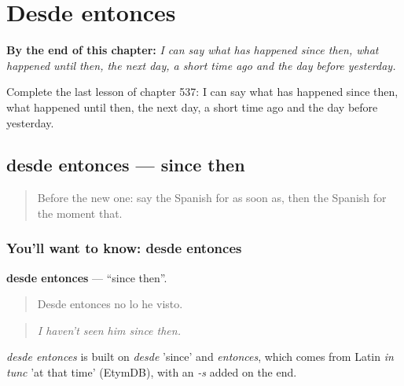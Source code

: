 
\chapter{Desde entonces}
\label{ch:es-desde-entonces}

\begin{chapteropening}
\textbf{By the end of this chapter:} \emph{I can say what has happened since then, what happened until then, the next day, a short time ago and the day before yesterday.}

Complete the last lesson of chapter 537: I can say what has happened since then, what happened until then, the next day, a short time ago and the day before yesterday.
\end{chapteropening}

\section[desde entonces]{desde entonces — since then}

\label{lesson:ES-C537-desde-entonces}



\begin{quote}
Before the new one: say the Spanish for as soon as, then the Spanish for the moment that.
\end{quote}

\subsection*{You'll want to know: desde entonces}
\textbf{desde entonces} — \textquotedblleft{}since then\textquotedblright{}.

\begin{quote}
Desde entonces no lo he visto.
\end{quote}

\begin{quote}
\emph{I haven't seen him since then.}
\end{quote}

\begin{cousinweb}
\emph{desde entonces} is built on \emph{desde} 'since' and \emph{entonces}, which comes from Latin \emph{in tunc} 'at that time' (EtymDB), with an \emph{-s} added on the end.
\end{cousinweb}

